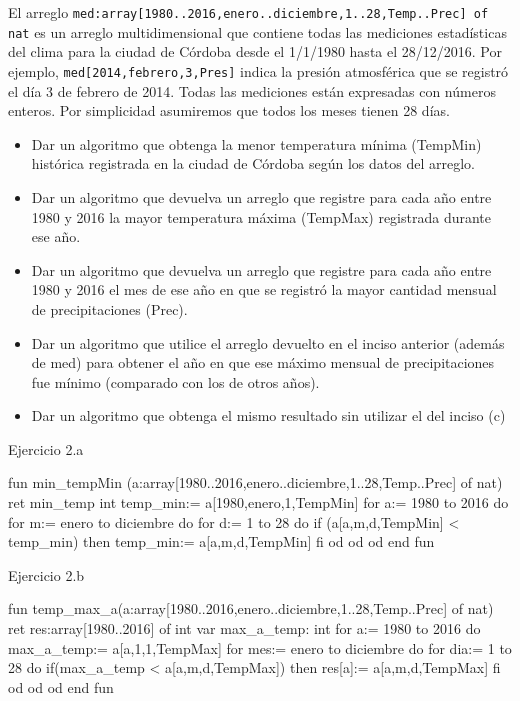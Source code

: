 El arreglo \texttt{med:array[1980..2016,enero..diciembre,1..28,Temp..Prec] of nat} es un arreglo multidimensional que contiene todas las mediciones estadísticas del clima para la ciudad de Córdoba desde el 1/1/1980 hasta el 28/12/2016. Por ejemplo, \texttt{med[2014,febrero,3,Pres]} indica la presión atmosférica que se registró el día 3 de febrero de 2014. Todas las mediciones están expresadas con números enteros. Por simplicidad asumiremos que todos los meses tienen 28 días.

\begin{itemize}
    \item[(a)] Dar un algoritmo que obtenga la menor temperatura mínima (TempMin) histórica registrada en la ciudad de Córdoba según los datos del arreglo.
    \item[(b)] Dar un algoritmo que devuelva un arreglo que registre para cada año entre 1980 y 2016 la mayor temperatura máxima (TempMax) registrada durante ese año.
    \item[(c)] Dar un algoritmo que devuelva un arreglo que registre para cada año entre 1980 y 2016 el mes de ese año en que se registró la mayor cantidad mensual de precipitaciones (Prec).
    \item[(d)] Dar un algoritmo que utilice el arreglo devuelto en el inciso anterior (además de med) para obtener el año en que ese máximo mensual de precipitaciones fue mínimo (comparado con los de otros años).
    \item[(e)]  Dar un algoritmo que obtenga el mismo resultado sin utilizar el del inciso (c)
\end{itemize}

\begin{codebox}{Ejercicio 2.a}
\begin{pascallike}
fun min_tempMin (a:array[1980..2016,enero..diciembre,1..28,Temp..Prec] of nat) 
ret min_temp int
    temp_min:= a[1980,enero,1,TempMin]
    for a:= 1980 to 2016 do
        for m:= enero to diciembre do
            for d:= 1 to 28 do
                if (a[a,m,d,TempMin] < temp_min) then
                    temp_min:= a[a,m,d,TempMin]
                fi 
            od
        od
    od
end fun
\end{pascallike}
\end{codebox}

\begin{codebox}{Ejercicio 2.b}
\begin{pascallike}
fun temp_max_a(a:array[1980..2016,enero..diciembre,1..28,Temp..Prec] of nat)
ret res:array[1980..2016] of int
    var max_a_temp: int
    for a:= 1980 to 2016 do
        max_a_temp:= a[a,1,1,TempMax]
        for mes:= enero to diciembre do
            for dia:= 1 to 28 do
            if(max_a_temp < a[a,m,d,TempMax]) then
                res[a]:= a[a,m,d,TempMax]
            fi
            od
        od
    od
end fun
\end{pascallike}
\end{codebox}

